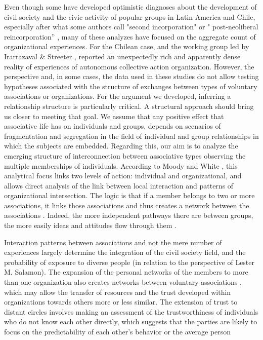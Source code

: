 Even though some have developed optimistic diagnoses about the development of civil society and the civic activity of popular groups in Latin America and Chile, especially after what some authors call "second incorporation" or " post-neoliberal reincorporation” \parencite{rossi_second_2015}, many of these analyzes have focused on the aggregate count of organizational experiences. For the Chilean case, \parencite{programa_de_las_naciones_unidas_para_el_desarrollo_desarrollo_2000} and the working group led by  Irarrazaval & Streeter \citeyear{irarrazaval_chile_2017}, reported an unexpectedly rich and apparently dense reality of experiences of autonomous collective action organization. However, the perspective and, in some cases, the data used in these studies do not allow testing hypotheses associated with the structure of exchanges between types of voluntary associations or organizations. For the argument we developed, inferring a relationship structure is particularly critical. A structural approach should bring us closer to meeting that goal. We assume that any positive effect that associative life has on individuals and groups, depends on scenarios of fragmentation and segregation in the field of individual and group relationships in which the subjects are embedded. Regarding this, our aim is to analyze the emerging structure of interconnection between associative types observing the multiple memberships of individuals. According to Moody and White  \citeyear{moody_structural_2003}, this analytical focus links two levels of action: individual and organizational, and allows direct analysis of the link between local interaction and patterns of organizational intersection. The logic is that if a member belongs to two or more associations, it links those associations and thus creates a network between the associations \parencite{moody_structural_2003}. Indeed, the more independent pathways there are between groups, the more easily ideas and attitudes flow through them \parencite{moody_structural_2003}.
\bigskip

Interaction patterns between associations and not the mere number of experiences largely determine the integration of the civil society field, and the probability of exposure to diverse people (in relation to the perspective of Lester M. Salamon). The expansion of the personal networks of the members to more than one organization also creates networks between voluntary associations \parencite{moody_structural_2003, kenis_how_2002}, which may allow the transfer of resources and the trust developed within organizations towards others more or less similar. The extension of trust to distant circles involves making an assessment of the trustworthiness of individuals who do not know each other directly, which suggests that the parties are likely to focus on the predictability of each other's behavior or the average person \parencite{glanville_why_2016, paxton_association_2007, paxton_is_2015}
\bigskip

